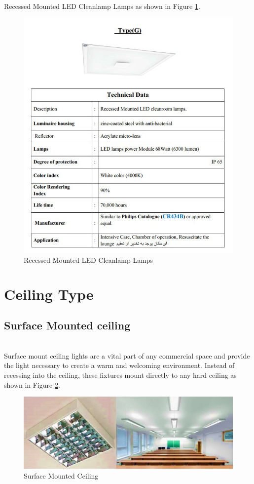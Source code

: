 \documentclass[12pt,fleqn]{book} %
\begin{document}
\newpage
\\Recessed Mounted LED Cleanlamp Lamps as shown in Figure \ref{fig:fikry 16}.
\begin{figure}[!h]
    \centering
    \includegraphics[width=1\linewidth]{fikry 16.png}
    \caption{Recessed Mounted LED Cleanlamp Lamps}
    \label{fig:fikry 16}
\end{figure}
\newpage

\section{Ceiling Type}
\subsection{Surface Mounted ceiling}
\\Surface mount ceiling lights are a vital part of any commercial space and provide the light necessary to create a warm and welcoming environment. Instead of recessing into the ceiling, these fixtures mount directly to any hard ceiling as shown in Figure \ref{fig:fikry 17}.
\begin{figure}[!h]
    \centering
    \includegraphics[width=1\linewidth]{fikry 17.png}
    \caption{Surface Mounted Ceiling}
    \label{fig:fikry 17}
\end{figure}
\end{document}
